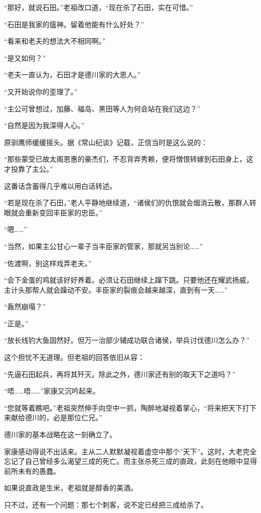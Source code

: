 \documentclass[
]{book}
\begin{document}
``那好，就说石田。''老祖改口道，``现在杀了石田，实在可惜。''

``石田是我家的瘟神。留着他能有什么好处？''

``看来和老夫的想法大不相同啊。''

``是又如何？''

``老夫一直认为，石田才是德川家的大恩人。''

``又开始说你的歪理了。''

``主公可曾想过，加藤、福岛、黑田等人为何会站在我们这边？''

``自然是因为我深得人心。''

原驯鹰师缓缓摇头。据《常山纪谈》记载，正信当时是这么说的：

``那些蒙受已故太阁恩惠的豪杰们，不忍背弃秀赖，便将憎恨转嫁到石田身上，这才投靠了主公。''

这番话含蓄得几乎难以用白话转述。

``若是现在杀了石田，''老人平静地继续道，``诸侯们的仇恨就会烟消云散，那群人转眼就会重新变回丰臣家的忠臣。''

``嗯\ldots\ldots{}''

``当然，如果主公甘心一辈子当丰臣家的管家，那就另当别论\ldots\ldots{}''

``佐渡啊，别这样戏弄老夫。''

``会下金蛋的鸡就该好好养着。必须让石田继续上蹿下跳。只要他还在耀武扬威，主计头那帮人就会躁动不安。丰臣家的裂痕会越来越深，直到有一天\ldots\ldots{}''

``轰然崩塌？''

``正是。''

``放长线钓大鱼固然好。但万一治部少辅成功联合诸侯，举兵讨伐德川怎么办？''

这个担忧不无道理。但老祖的回答依旧从容：

``先逼石田起兵，再将其歼灭。除此之外，德川家还有别的取天下之道吗？''

``唔\ldots\ldots 唔\ldots\ldots{}''家康又沉吟起来。

``您就等着瞧吧。''老祖突然伸手向空中一抓，陶醉地凝视着掌心，``将来把天下打下来献给德川的，必是那位仁兄。''

德川家的基本战略在这一刻确立了。

家康感动得说不出话来。主从二人默默凝视着虚空中那个''天下''。这时，大老完全忘记了自己曾经多么渴望三成的死亡。而主张杀死三成的直政，此刻在他眼中显得前所未有的愚蠢。

如果说直政是生米，老祖就是醇香的美酒。

只不过，还有一个问题：那七个刺客，说不定已经把三成给杀了。
\end{document}
